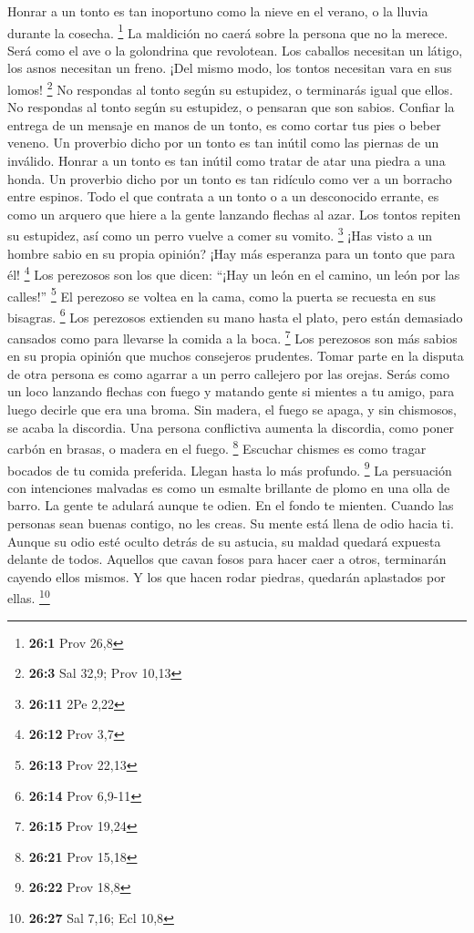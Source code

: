  Honrar a un tonto es tan inoportuno como la nieve en el
verano, o la lluvia durante la cosecha. \footnote{\textbf{26:1} Prov
  26,8}  La maldición no caerá sobre la persona que no la
merece. Será como el ave o la golondrina que revolotean. 
Los caballos necesitan un látigo, los asnos necesitan un freno. ¡Del
mismo modo, los tontos necesitan vara en sus lomos! \footnote{\textbf{26:3}
  Sal 32,9; Prov 10,13}  No respondas al tonto según su
estupidez, o terminarás igual que ellos.  No respondas al
tonto según su estupidez, o pensaran que son sabios. 
Confiar la entrega de un mensaje en manos de un tonto, es como cortar
tus pies o beber veneno.  Un proverbio dicho por un tonto es
tan inútil como las piernas de un inválido.  Honrar a un
tonto es tan inútil como tratar de atar una piedra a una honda.
 Un proverbio dicho por un tonto es tan ridículo como ver a
un borracho entre espinos.  Todo el que contrata a un tonto
o a un desconocido errante, es como un arquero que hiere a la gente
lanzando flechas al azar.  Los tontos repiten su estupidez,
así como un perro vuelve a comer su vomito. \footnote{\textbf{26:11} 2Pe
  2,22}  ¡Has visto a un hombre sabio en su propia opinión?
¡Hay más esperanza para un tonto que para él! \footnote{\textbf{26:12}
  Prov 3,7}  Los perezosos son los que dicen: ``¡Hay un
león en el camino, un león por las calles!'' \footnote{\textbf{26:13}
  Prov 22,13}  El perezoso se voltea en la cama, como la
puerta se recuesta en sus bisagras. \footnote{\textbf{26:14} Prov 6,9-11}
 Los perezosos extienden su mano hasta el plato, pero están
demasiado cansados como para llevarse la comida a la boca. \footnote{\textbf{26:15}
  Prov 19,24}  Los perezosos son más sabios en su propia
opinión que muchos consejeros prudentes.  Tomar parte en la
disputa de otra persona es como agarrar a un perro callejero por las
orejas.  Serás como un loco lanzando flechas con fuego y
matando gente  si mientes a tu amigo, para luego decirle
que era una broma.  Sin madera, el fuego se apaga, y sin
chismosos, se acaba la discordia.  Una persona conflictiva
aumenta la discordia, como poner carbón en brasas, o madera en el fuego.
\footnote{\textbf{26:21} Prov 15,18}  Escuchar chismes es
como tragar bocados de tu comida preferida. Llegan hasta lo más
profundo. \footnote{\textbf{26:22} Prov 18,8}  La
persuación con intenciones malvadas es como un esmalte brillante de
plomo en una olla de barro.  La gente te adulará aunque te
odien. En el fondo te mienten.  Cuando las personas sean
buenas contigo, no les creas. Su mente está llena de odio hacia ti.
 Aunque su odio esté oculto detrás de su astucia, su maldad
quedará expuesta delante de todos.  Aquellos que cavan
fosos para hacer caer a otros, terminarán cayendo ellos mismos. Y los
que hacen rodar piedras, quedarán aplastados por ellas. \footnote{\textbf{26:27}
  Sal 7,16; Ecl 10,8}

